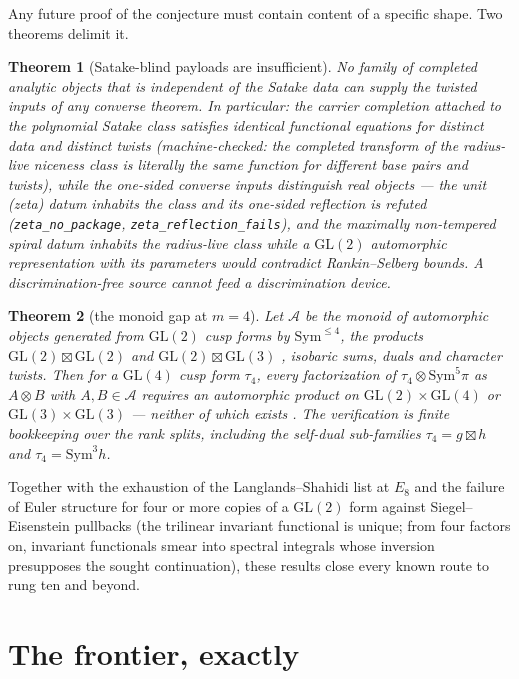 \documentclass[11pt]{article}
\newtheorem{theorem}{Theorem}[section]
\theoremstyle{definition}
\theoremstyle{remark}
\newcommand{\Sym}{\mathrm{Sym}}
\newcommand{\GL}{\mathrm{GL}}
\begin{document}
Any future proof of the conjecture must contain content of a specific shape.
Two theorems delimit it.

\begin{theorem}[Satake-blind payloads are insufficient]\label{thm:blind}
No family of completed analytic objects that is independent of the Satake
data can supply the twisted inputs of any converse theorem.  In particular:
the carrier completion attached to the polynomial Satake class satisfies
identical functional equations for distinct data and distinct twists
(machine-checked: the completed transform of the radius-live niceness class
is literally the same function for different base pairs and twists), while
the one-sided converse inputs distinguish real objects --- the unit (zeta)
datum inhabits the class and its one-sided reflection is refuted
(\texttt{zeta\_no\_package}, \texttt{zeta\_reflection\_fails}), and the
maximally non-tempered spiral datum inhabits the radius-live class while a
$\GL(2)$ automorphic representation with its parameters would contradict
Rankin--Selberg bounds.  A discrimination-free source cannot feed a
discrimination device.
\end{theorem}

\begin{theorem}[the monoid gap at $m=4$]\label{thm:monoid}
Let $\mathcal{A}$ be the monoid of automorphic objects generated from
$\GL(2)$ cusp forms by $\Sym^{\le4}$, the products
$\GL(2)\boxtimes\GL(2)$ \cite{Ramakrishnan} and $\GL(2)\boxtimes\GL(3)$
\cite{KimShahidiAnnals}, isobaric sums, duals and character twists.  Then for
a $\GL(4)$ cusp form $\tau_4$, every factorization of
$\tau_4\otimes\Sym^5\pi$ as $A\otimes B$ with $A,B\in\mathcal{A}$ requires an
automorphic product on $\GL(2)\times\GL(4)$ or $\GL(3)\times\GL(3)$ ---
neither of which exists \cite{Cogdell}.  The verification is finite
bookkeeping over the rank splits, including the self-dual sub-families
$\tau_4=g\boxtimes h$ and $\tau_4=\Sym^3 h$.
\end{theorem}

Together with the exhaustion of the Langlands--Shahidi list at $E_8$ and the
failure of Euler structure for four or more copies of a $\GL(2)$ form against
Siegel--Eisenstein pullbacks (the trilinear invariant functional is unique;
from four factors on, invariant functionals smear into spectral integrals
whose inversion presupposes the sought continuation), these results close
every known route to rung ten and beyond.

\section{The frontier, exactly}\label{sec:frontier}
\end{document}
